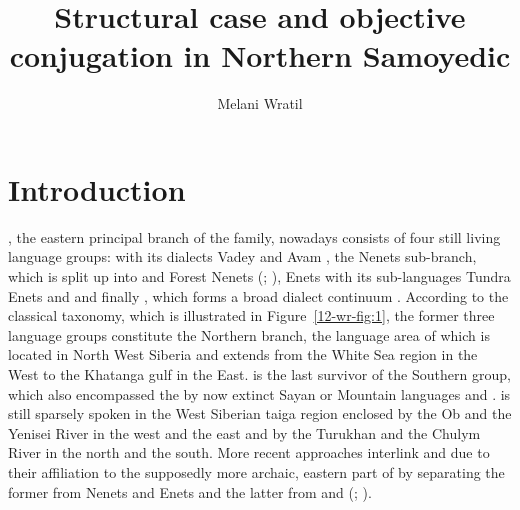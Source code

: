 \documentclass[output=paper]{LSP/langsci}
\author{Melani Wratil\affiliation{University of Düsseldorf}}
\title{Structural case and objective conjugation in Northern Samoyedic}
\begin{document}
\section{Introduction}
\label{12-wr-sec:1}

, the eastern principal branch of the  family, nowadays consists of four still living language groups:  with its dialects Vadey and Avam \citep[480--482]{Helimski1998Nganasan}, the Nenets sub-branch, which is split up into  and Forest Nenets (\citealt[13--14]{Salminen1997Tundra}; \citealt[1--2]{Nikolaeva2014Grammar}), Enets with its sub-languages Tundra Enets and  \citep[45]{Siegl2013Materials} and finally , which forms a broad dialect continuum \citep[549--550]{Helimski1998Selkup}. According to the classical taxonomy, which is illustrated in Figure~\ref{12-wr-fig:1}, the former three language groups constitute the Northern  branch, the language area of which is located in North West Siberia and extends from the White Sea region in the West to the Khatanga gulf in the East.  is the last survivor of the Southern  group, which also encompassed the by now extinct Sayan or Mountain  languages  and  \citep[457--458]{Janhunen1998Samoyedic}.  is still sparsely spoken in the West Siberian taiga region enclosed by the Ob and the Yenisei River in the west and the east and by the Turukhan and the Chulym River in the north and the south. More recent approaches interlink  and  due to their affiliation to the supposedly more archaic, eastern part of  by separating the former from Nenets and Enets and the latter from  and  (\cf \citealt[458--459]{Janhunen1998Samoyedic}; \citealt[35--36]{Siegl2013Materials}). 
\end{document}

